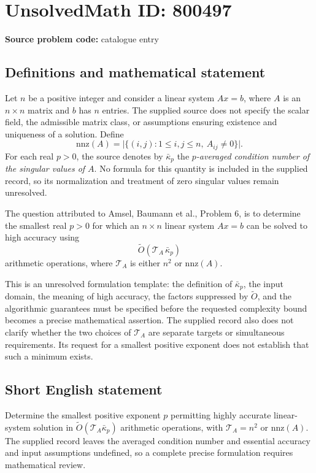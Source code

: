 \documentclass[11pt]{article}
\begin{document}
\section*{UnsolvedMath ID: 800497}
\textbf{Source problem code:} catalogue entry
\subsection{Definitions and mathematical statement}
Let \(n\) be a positive integer and consider a linear system \(Ax=b\), where \(A\) is an \(n\times n\) matrix and \(b\) has \(n\) entries. The supplied source does not specify the scalar field, the admissible matrix class, or assumptions ensuring existence and uniqueness of a solution. Define
\[
\mathrm{nnz}(A)=\bigl|\{(i,j):1\leq i,j\leq n,\ A_{ij}\neq 0\}\bigr|.
\]
For each real \(p>0\), the source denotes by \(\bar\kappa_p\) the \emph{\(p\)-averaged condition number of the singular values of \(A\)}. No formula for this quantity is included in the supplied record, so its normalization and treatment of zero singular values remain unresolved.

The question attributed to Amsel, Baumann et al., Problem 6, is to determine the smallest real \(p>0\) for which an \(n\times n\) linear system \(Ax=b\) can be solved to high accuracy using
\[
\widetilde O\!\left(\mathcal T_A\,\bar\kappa_p\right)
\]
arithmetic operations, where \(\mathcal T_A\) is either \(n^2\) or \(\mathrm{nnz}(A)\).

This is an unresolved formulation template: the definition of \(\bar\kappa_p\), the input domain, the meaning of high accuracy, the factors suppressed by \(\widetilde O\), and the algorithmic guarantees must be specified before the requested complexity bound becomes a precise mathematical assertion. The supplied record also does not clarify whether the two choices of \(\mathcal T_A\) are separate targets or simultaneous requirements. Its request for a smallest positive exponent does not establish that such a minimum exists.
\subsection{Short English statement}
Determine the smallest positive exponent \(p\) permitting highly accurate linear-system solution in \(\widetilde O(\mathcal T_A\bar\kappa_p)\) arithmetic operations, with \(\mathcal T_A=n^2\) or \(\mathrm{nnz}(A)\). The supplied record leaves the averaged condition number and essential accuracy and input assumptions undefined, so a complete precise formulation requires mathematical review.
\end{document}
